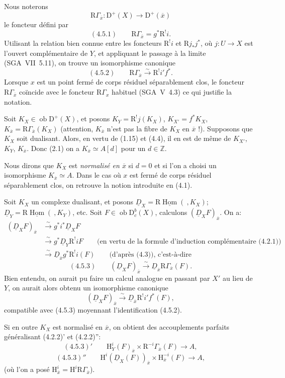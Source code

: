 \documentclass[11pt]{article}
\renewcommand{\H}{\mathrm{H}}
\DeclareMathOperator{\Hom}{Hom}
\newcommand{\R}{\mathrm{R}}
\newcommand{\D}{\mathrm{D}}
\newcommand{\Z}{\mathbb{Z}}
\newcommand{\ob}{\operatorname{ob}}
\newcommand{\ol}[1]{\overline{#1}}
\begin{document}
Nous noterons
\[
\R\Gamma_{\ol{x}}:\D^+(X)\longrightarrow \D^+(\ol{x})
\]
le foncteur défini par
\[
(4.5.1)\qquad \R\Gamma_{\ol{x}}=g^*\R^{!}i.
\]
Utilisant la relation bien connue entre les foncteurs $\R^{!}i$ et $\R j_*j^*$, où $j:U\to X$ est l'ouvert complémentaire de $Y$, et appliquant le passage à la limite (SGA~VII~5.11), on trouve un isomorphisme canonique
\[
(4.5.2)\qquad \R\Gamma_{\ol{x}}\xrightarrow{\sim}\R^{!}i' f^*.
\]
Lorsque $x$ est un point fermé de corps résiduel séparablement clos, le foncteur $\R\Gamma_{\ol{x}}$ coïncide avec le foncteur $\R\Gamma_x$ habituel (SGA~V~4.3) ce qui justifie la notation.

Soit $K_X\in\ob\D^+(X)$, et posons $K_Y=\R^{!}j(K_X)$, $K_{X'}=f^*K_X$, $K_{\ol{x}}=\R\Gamma_{\ol{x}}(K_X)$ (attention, $K_{\ol{x}}$ n'est pas la fibre de $K_X$ en $\ol{x}$ !). Supposons que $K_X$ soit dualisant. Alors, en vertu de (1.15) et (4.4), il en est de même de $K_{X'}$, $K_Y$, $K_{\ol{x}}$. Donc (2.1) on a $K_{\ol{x}}\simeq A[d]$ pour un $d\in\Z$.

Nous dirons que $K_X$ est \emph{normalisé en $\ol{x}$} si $d=0$ et si l'on a choisi un isomorphisme $K_{\ol{x}}\simeq A$. Dans le cas où $x$ est fermé de corps résiduel séparablement clos, on retrouve la notion introduite en (4.1).

Soit $K_X$ un complexe dualisant, et posons $\underline{D}_X=\R\underline{\Hom}(\ ,K_X)$; $\underline{D}_Y=\R\underline{\Hom}(\ ,K_Y)$, etc. Soit $F\in\ob\D_c^b(X)$, calculons $(\underline{D}_XF)_{\ol{x}}$. On a:
\[
\begin{aligned}
(\underline{D}_XF)_{\ol{x}}&\xrightarrow{\sim}g^*i^*\underline{D}_X F\\
&\xrightarrow{\sim}g^*\underline{D}_Y\R^{!}iF\qquad\text{(en vertu de la formule d'induction complémentaire (4.2.1))}\\
&\xrightarrow{\sim}\underline{D}_{\ol{x}}g^*\R^{!}i(F)\qquad\text{(d'après (4.3)), c'est-à-dire}
\end{aligned}
\]
\[
(4.5.3)\qquad (\underline{D}_X F)_{\ol{x}}\xrightarrow{\sim}\underline{D}_{\ol{x}}\R\Gamma_{\ol{x}}(F).
\]
Bien entendu, on aurait pu faire un calcul analogue en passant par $X'$ au lieu de $Y$, on aurait alors obtenu un isomorphisme canonique
\[
(\underline{D}_XF)_{\ol{x}}\xrightarrow{\sim}\underline{D}_{\ol{x}}\R^{!}i'f^*(F),
\]
compatible avec (4.5.3) moyennant l'identification (4.5.2).

Si en outre $K_X$ est normalisé en $\ol{x}$, on obtient des accouplements parfaits généralisant (4.2.2)' et (4.2.2)'':
\[
(4.5.3)'\qquad \H_Y^i(F)_{\ol{x}}\times \R^{-i}\Gamma_{\ol{x}}(F)\longrightarrow A,
\]
\[
(4.5.3)''\qquad \H^i(\underline{D}_X(F))_{\ol{x}}\times \H_{\ol{x}}^{-i}(F)\longrightarrow A,
\]
(où l'on a posé $\H_{\ol{x}}^i=\H^i\R\Gamma_{\ol{x}}$).
\end{document}
